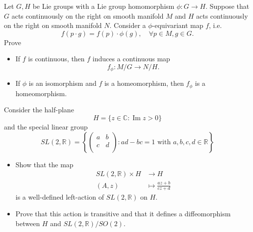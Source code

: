 \begin{exercise}
    Let $G,H$ be Lie groups with a Lie group homomorphism
    $\phi :G\to H$. Suppose that $G$ acts continuously on
    the right on smooth manifold $M$ and $H$ acts continuously
    on the right on smooth manifold $N$. Consider a $\phi$-equivariant
    map $f$, i.e.
    \begin{equation*}
        f(p\cdot g)=f(p)\cdot \phi(g),\quad \forall p\in M, g\in G.
    \end{equation*}
    Prove
    \begin{itemize}
        \item If $f$ is continuous, then $f$ induces a continuous map
        \begin{equation*}
            f_\phi :M/G\to N/H.
        \end{equation*}

        \item If $\phi$ is an isomorphism and $f$ is a homeomorphism, 
        then $f_\phi$ is a homeomorphism.
    \end{itemize}
\end{exercise}

\begin{exercise}
    Consider the half-plane
    \begin{equation*}
        H=\{z\in \mathbb{C}:\operatorname{Im}z>0\}
    \end{equation*}
    and the special linear group
    \begin{equation*}
        SL( 2,\mathbb{R} ) 
        =\left\{ \left( 
        \begin{matrix}
	    a&		b\\
	    c&		d\\
        \end{matrix} \right) 
        :ad-bc=1 \text{ with } a,b,c,d\in \mathbb{R} \right\} 
    \end{equation*}
    \begin{itemize}
        \item Show that the map
        \begin{align}
            SL(2,\mathbb{R})\times H &\to H \\
            (A,z) &\mapsto \frac{az+b}{cz+d}
        \end{align}
        is a well-defined left-action of $SL(2,\mathbb{R})$ on $H$.

        \item Prove that this action is transitive and that it defines
        a diffeomorphism between $H$ and $SL(2,\mathbb{R})/SO(2)$.
    \end{itemize}
\end{exercise}


